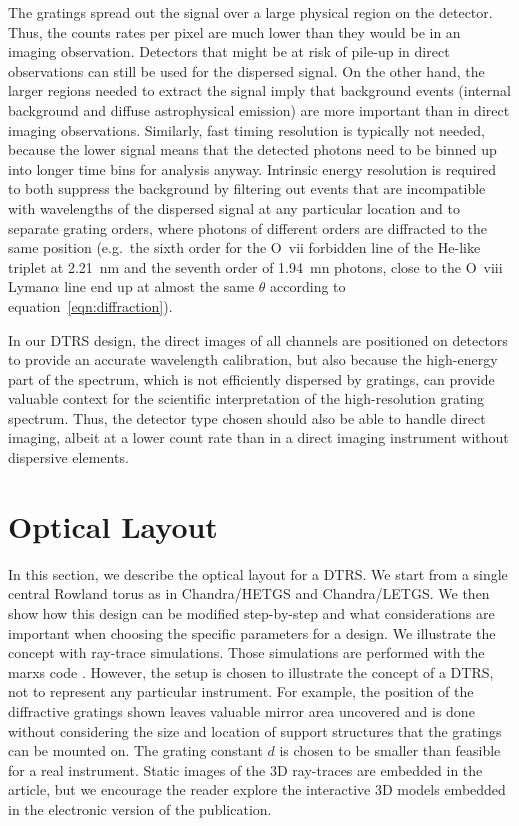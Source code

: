 \documentclass[linenumbers]{aastex631}
\begin{document}
The gratings spread out the signal over a large physical region on the detector. Thus, the counts rates per pixel are much lower than they would be in an imaging observation. Detectors that might be at risk of pile-up in direct observations can still be used for the dispersed signal. On the other hand, the larger regions needed to extract the signal imply that background events (internal background and diffuse astrophysical emission) are more important than in direct imaging observations. Similarly, fast timing resolution is typically not needed, because the lower signal means that the detected photons need to be binned up into longer time bins for analysis anyway. Intrinsic energy resolution is required to both suppress the background by filtering out events that are incompatible with wavelengths of the dispersed signal at any particular location and to separate grating orders, where photons of different orders are diffracted to the same position (e.g.\ the sixth order for the O~{\sc vii} forbidden line of the He-like triplet at 2.21~nm and the seventh order of 1.94~mn photons, close to the O~{\sc viii} Lyman$\alpha$ line end up at almost the same $\theta$ according to equation~\ref{eqn:diffraction}).

In our DTRS design, the direct images of all channels are positioned on detectors to provide an accurate wavelength calibration, but also because the high-energy part of the spectrum, which is not efficiently dispersed by gratings, can provide valuable context for the scientific interpretation of the high-resolution grating spectrum. Thus, the detector type chosen should also be able to handle direct imaging, albeit at a lower count rate than in a direct imaging instrument without dispersive elements.

\section{Optical Layout}
\label{sect:opticallayout}
In this section, we describe the optical layout for a DTRS. We start from a single central Rowland torus as in Chandra/HETGS and Chandra/LETGS. We then show how this design can be modified step-by-step and what considerations are important when choosing the specific parameters for a design. We illustrate the concept with ray-trace simulations. Those simulations are performed with the marxs code \citep{2017AJ....154..243G}. However, the setup is chosen to illustrate the concept of a DTRS, not to represent any particular instrument. For example, the position of the diffractive gratings shown leaves valuable mirror area uncovered and is done without considering the size and location of support structures that the gratings can be mounted on. The grating constant $d$ is chosen to be smaller than feasible for a real instrument. Static images of the 3D ray-traces are embedded in the article, but we encourage the reader explore the interactive 3D models embedded in the electronic version of the publication.
\end{document}
